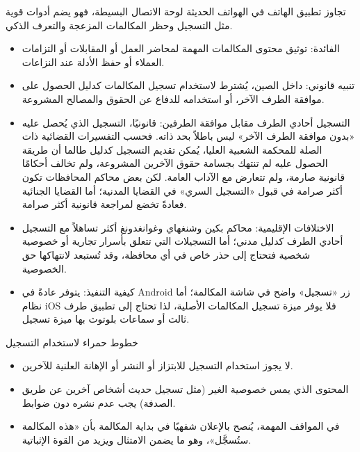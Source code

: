 


تجاوز تطبيق الهاتف في الهواتف الحديثة لوحة الاتصال البسيطة، فهو يضم أدوات قوية مثل التسجيل وحظر المكالمات المزعجة والتعرف الذكي.


\begin{itemize}
  \item الفائدة: توثيق محتوى المكالمات المهمة لمحاضر العمل أو المقابلات أو التزامات العملاء أو حفظ الأدلة عند النزاعات.
  \item تنبيه قانوني: داخل الصين، يُشترط لاستخدام تسجيل المكالمات كدليل الحصول على موافقة الطرف الآخر، أو استخدامه للدفاع عن الحقوق والمصالح المشروعة.
  \item التسجيل أحادي الطرف مقابل موافقة الطرفين: قانونيًا، التسجيل الذي يُحصل عليه «بدون موافقة الطرف الآخر» ليس باطلاً بحد ذاته. فحسب التفسيرات القضائية ذات الصلة للمحكمة الشعبية العليا، يُمكن تقديم التسجيل كدليل طالما أن طريقة الحصول عليه لم تنتهك بجسامة حقوق الآخرين المشروعة، ولم تخالف أحكامًا قانونية صارمة، ولم تتعارض مع الآداب العامة. لكن بعض محاكم المحافظات تكون أكثر صرامة في قبول «التسجيل السري» في القضايا المدنية؛ أما القضايا الجنائية فعادةً تخضع لمراجعة قانونية أكثر صرامة.
  \item الاختلافات الإقليمية: محاكم بكين وشنغهاي وغوانغدونغ أكثر تساهلاً مع التسجيل أحادي الطرف كدليل مدني؛ أما التسجيلات التي تتعلق بأسرار تجارية أو خصوصية شخصية فتحتاج إلى حذر خاص في أي محافظة، وقد تُستبعد لانتهاكها حق الخصوصية.
  \item كيفية التنفيذ: يتوفر عادةً في Android زر «تسجيل» واضح في شاشة المكالمة؛ أما نظام iOS فلا يوفر ميزة تسجيل المكالمات الأصلية، لذا تحتاج إلى تطبيق طرف ثالث أو سماعات بلوتوث بها ميزة تسجيل.
\end{itemize}

\begin{tcbwarn}{خطوط حمراء لاستخدام التسجيل}
\begin{itemize}
  \item لا يجوز استخدام التسجيل للابتزاز أو النشر أو الإهانة العلنية للآخرين.
  \item المحتوى الذي يمس خصوصية الغير (مثل تسجيل حديث أشخاص آخرين عن طريق الصدفة) يجب عدم نشره دون ضوابط.
  \item في المواقف المهمة، يُنصح بالإعلان شفهيًا في بداية المكالمة بأن «هذه المكالمة ستُسجَّل»، وهو ما يضمن الامتثال ويزيد من القوة الإثباتية.
\end{itemize}

\end{tcbwarn}

